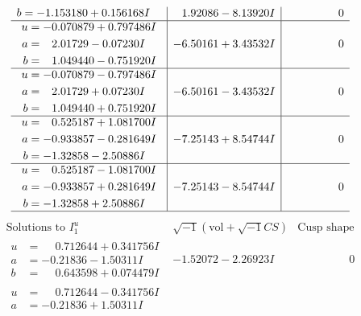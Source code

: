 \documentclass[1p]{elsarticle_modified}
\theoremstyle{definition}
\newcommand{\I}{\sqrt{-1}}
\begin{document}
$$\begin{array}{c|c|c}
\begin{aligned}
b &= -1.153180 + 0.156168 I\end{aligned}
 & \phantom{-}1.92086 - 8.13920 I & \phantom{-0.000000 } 0 \\ \hline\begin{aligned}
u &= -0.070879 + 0.797486 I \\
a &= \phantom{-}2.01729 - 0.07230 I \\
b &= \phantom{-}1.049440 - 0.751920 I\end{aligned}
 & -6.50161 + 3.43532 I & \phantom{-0.000000 } 0 \\ \hline\begin{aligned}
u &= -0.070879 - 0.797486 I \\
a &= \phantom{-}2.01729 + 0.07230 I \\
b &= \phantom{-}1.049440 + 0.751920 I\end{aligned}
 & -6.50161 - 3.43532 I & \phantom{-0.000000 } 0 \\ \hline\begin{aligned}
u &= \phantom{-}0.525187 + 1.081700 I \\
a &= -0.933857 - 0.281649 I \\
b &= -1.32858 - 2.50886 I\end{aligned}
 & -7.25143 + 8.54744 I & \phantom{-0.000000 } 0 \\ \hline\begin{aligned}
u &= \phantom{-}0.525187 - 1.081700 I \\
a &= -0.933857 + 0.281649 I \\
b &= -1.32858 + 2.50886 I\end{aligned}
 & -7.25143 - 8.54744 I & \phantom{-0.000000 } 0\\
 \hline 
 \end{array}$$\newpage$$\begin{array}{c|c|c}  
\text{Solutions to }I^u_{1}& \I (\text{vol} + \sqrt{-1}CS) & \text{Cusp shape}\\
 \hline 
\begin{aligned}
u &= \phantom{-}0.712644 + 0.341756 I \\
a &= -0.21836 - 1.50311 I \\
b &= \phantom{-}0.643598 + 0.074479 I\end{aligned}
 & -1.52072 - 2.26923 I & \phantom{-0.000000 } 0 \\ \hline\begin{aligned}
u &= \phantom{-}0.712644 - 0.341756 I \\
a &= -0.21836 + 1.50311 I \\

\end{aligned}
\end{array}$$
\end{document}
